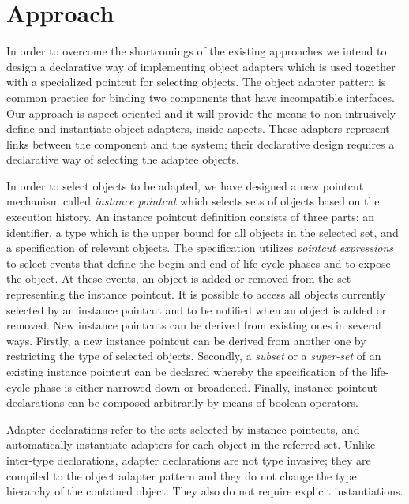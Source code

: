 \documentclass{llncs}
\begin{document}
\section{Approach}

In order to overcome the shortcomings of the existing approaches we intend to design a declarative way of implementing object adapters which is used together with a specialized pointcut for selecting objects. The object adapter pattern is common practice for binding two components that have incompatible interfaces. Our approach is aspect-oriented and it will provide the means to non-intrusively define and instantiate object adapters, inside aspects. These adapters represent links between the component and the system; their declarative design requires a declarative way of selecting the adaptee objects. 

In order to select objects to be adapted, we have designed a new pointcut mechanism called \emph{instance pointcut} which selects sets of objects based on the execution history.
An instance pointcut definition consists of three parts: an identifier, a type which is the upper bound for all objects in the selected set, and a specification of relevant objects.
The specification utilizes \emph{pointcut expressions} to select events that define the begin and end of life-cycle phases and to expose the object.
At these events, an object is added or removed from the set representing the instance pointcut.
It is possible to access all objects currently selected by an instance pointcut and to
be notified when an object is added or removed.
New instance pointcuts can be derived from existing ones in several ways. Firstly, a new instance pointcut can be derived from another one by restricting the type of selected objects. Secondly, a \emph{subset} or a \emph{super-set} of an existing instance pointcut can be declared whereby the specification of the life-cycle phase is either narrowed down or broadened. Finally, instance pointcut declarations can be composed arbitrarily by means of boolean operators. 

Adapter declarations refer to the sets selected by instance pointcuts, and automatically instantiate adapters for each object in the referred set. Unlike inter-type declarations, adapter declarations are not type invasive; they are compiled to the object adapter pattern and they do not change the type hierarchy of the contained object. They also do not require explicit instantiations. 
\end{document}
